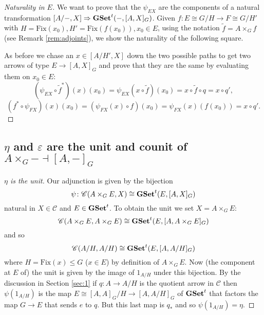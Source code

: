 \documentclass[italian, 12pt, reqno]{article}
\theoremstyle{myteo}
\numberwithin{equation}{section}
\newcommand{\cat}[1]{\mathscr{#1}}
\newcommand{\gset}{\text{\textbf{GSet}}}
\newcommand{\tgset}{\text{\textbf{GSet}}^t}
\newcommand{\homs}[2]{[#1, #2]}
\newcommand{\fun}[3]{#1\colon#2\to #3}
\begin{document}
\begin{proof}[Naturality in \(E\)]
  \label{proof:naturality_in_E}
  We want to prove that the \(\psi_{EX}\) are the components of a natural transformation \(\homs{A/-}{X}\Rightarrow\tgset(-, \homs{A}{X}_G)\).
	Given \(\fun{f}{E\cong G/H}{F\cong G/H'}\) with \(H=\text{Fix}(x_0), H'=\text{Fix}(f(x_0)), x_0\in E\), using the notation \(\tilde{f} = A\times_G f\) (see Remark \ref{rem:adjoints}), we show the naturality of the following square.
  \begin{center}
  \end{center}
  As before we chase an \(x\in\homs{A/H'}{X}\) down the two possible paths to get two arrows of type \(E\to\homs{A}{X}_G\) and prove that they are the same by evaluating them on \(x_0\in E\):
  \[(\psi_{EX}\circ \widetilde{f}^*)(x)(x_0) = \psi_{EX}(x\circ \widetilde{f})(x_0) = x\circ \widetilde{f}\circ q = x\circ q',\]
  \[(f^*\circ \psi_{FX})(x)(x_0) = (\psi_{FX}(x)\circ f)(x_0) = \psi_{FX}(x)(f(x_0)) = x\circ q'.\]
\end{proof}

\subsection{\(\eta\) and \(\varepsilon\) are the unit and counit of \(A\times_G- \dashv \homs{A}{-}_G\)}

\begin{proof}[\(\eta\) is the unit]
  Our adjunction is given by the bijection
  \[\psi\colon\cat{C}(A\times_G E, X)\cong\tgset(E, \homs{A}{X}_G)\]
  natural in \(X\in\cat{C}\) and \(E\in\tgset\).
  To obtain the unit we set \(X = A\times_G E\):
  \[\cat{C}(A\times_G E, A\times_G E)\cong\tgset(E, \homs{A}{A\times_G E}_G)\]
  and so
  \[\cat{C}(A/H, A/H)\cong\tgset(E, \homs{A}{A/H}_G)\]
  where \(H = \text{Fix}(x)\leq G\) (\(x\in E\)) by definition of \(A\times_G E\).
  Now (the component at \(E\) of) the unit is given by the image of \(1_{A/H}\) under this bijection.
  By the discussion in Section \ref{sec:1} if \(\fun{q}{A}{A/H}\) is the quotient arrow in \(\cat{C}\) then \(\psi(1_{A/H})\) is the map \(E\cong\homs{A}{A}_G/H \to \homs{A}{A/H}_G\) of \(\tgset\) that factors the map \(G\to E\) that sends \(e\) to \(q\).
  But this last map is \(q_*\) and so \(\psi(1_{A/H}) = \eta\).
\end{proof}
\end{document}
